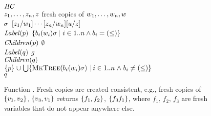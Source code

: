 \begin{figure}[t]
\begin{minipage}[t]{.94\columnwidth}
    $\textit{HC}$\\
    \tabTTT $z_1, \dots, z_n, z$ \algAssgn fresh copies
    of $w_1, \dots, w_n, w$\\
    \tabTTT $\sigma$ \algAssgn $[z_1/w_1]\cdots[z_n/w_n][u/z]$\\
    \tabT $\mathit{Label}(p)$ \algAssgn 
    $\{
      b_i(w_i)\sigma
      \mid i\in1..n\land b_i = (\leq)
    \}
    $\\
    \tabT $\mathit{Children}(p)$ \algAssgn $\emptyset$\\
    \tabT $\mathit{Label}(q)$ \algAssgn $g$ \\ 
    \tabT $\mathit{Children}(q)$ \algAssgn \\
    \mbox{} \hfill $
    \begin{array}[t]{@{}l}
      \set{p}\mathrel{\cup} 
      \bigcup
      \set{
        \algMkHornTree(
        \HornBody_i(\FreeVars_i)\headSubst
        ) 
        \mid
        \begin{array}[t]{@{}l}
          i \in \betweenOf{1}{n}\mathrel{\land} 
          \HornBody_i \neq (\leq)}
        \end{array}
      \end{array}
    $ \\
    \tabT \algReturn $q$ \\
    \algEnd
  \end{minipage}
  \vspace{1ex}
  \linespread{1}
  \caption{Function \algMkHornTree.
  Fresh copies are created consistent, e.g., fresh copies of $\{v_1,
    v_2\}$, $\{v_3, v_1\}$ returns $\{f_1, f_2\}$, $\{f_3 f_1\}$, where
  $f_1$, $f_2$, $f_3$ are fresh variables that do not appear anywhere
  else. }
  \label{fig-alg-mkTree}
\end{figure}
